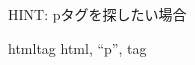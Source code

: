 \begin{tcolorbox}[title=\useOmetoi,breakable]\label{Q:tag}
  \begin{enumerate}
    HINT: pタグを探したい場合
    
    htmltag html, “p”, tag
  \end{enumerate}
\end{tcolorbox}




